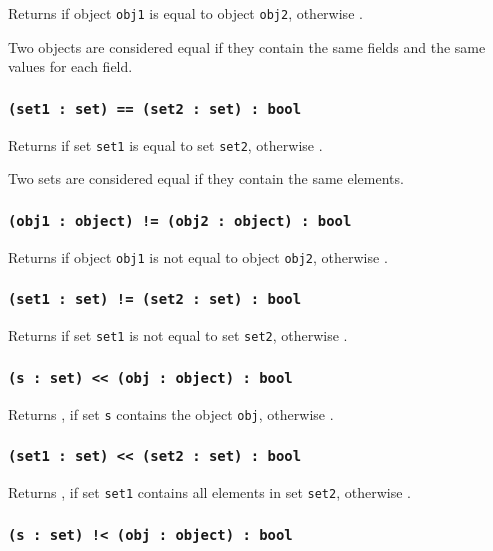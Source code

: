 Returns \true{} if object \texttt{obj1} is equal to object \texttt{obj2}, otherwise \false{}.

Two objects are considered equal if they contain the same fields and the same values for each field.

\subsubsection{\texttt{(set1 : set) == (set2 : set) : bool}}

Returns \true{} if set \texttt{set1} is equal to set \texttt{set2}, otherwise \false{}.

Two sets are considered equal if they contain the same elements.

\subsubsection{\texttt{(obj1 : object) != (obj2 : object) : bool}}

Returns \true{} if object \texttt{obj1} is not equal to object \texttt{obj2}, otherwise \false{}.

\subsubsection{\texttt{(set1 : set) != (set2 : set) : bool}}

Returns \true{} if set \texttt{set1} is not equal to set \texttt{set2}, otherwise \false{}.

\subsubsection{\texttt{(s : set) << (obj : object) : bool}}

Returns \true{}, if set \texttt{s} contains the object \texttt{obj}, otherwise \false{}.

\subsubsection{\texttt{(set1 : set) << (set2 : set) : bool}}

Returns \true, if set \texttt{set1} contains all elements in set \texttt{set2}, otherwise \false.

\subsubsection{\texttt{(s : set) !< (obj : object) : bool}}

